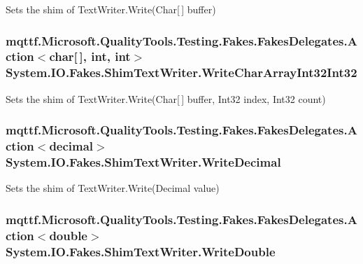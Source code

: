 Sets the shim of Text\-Writer.\-Write(\-Char\mbox{[}$\,$\mbox{]} buffer)

\hypertarget{class_system_1_1_i_o_1_1_fakes_1_1_shim_text_writer_a7270f99bbf90fc744ed5f3eefb151cf2}{
\subsubsection[{Write\-Char\-Array\-Int32\-Int32}]{\setlength{\rightskip}{0pt plus 5cm}mqttf.\-Microsoft.\-Quality\-Tools.\-Testing.\-Fakes.\-Fakes\-Delegates.\-Action$<$char\mbox{[}$\,$\mbox{]}, int, int$>$ System.\-I\-O.\-Fakes.\-Shim\-Text\-Writer.\-Write\-Char\-Array\-Int32\-Int32\hspace{0.3cm}{\ttfamily [set]}}}\label{class_system_1_1_i_o_1_1_fakes_1_1_shim_text_writer_a7270f99bbf90fc744ed5f3eefb151cf2}


Sets the shim of Text\-Writer.\-Write(\-Char\mbox{[}$\,$\mbox{]} buffer, Int32 index, Int32 count)

\hypertarget{class_system_1_1_i_o_1_1_fakes_1_1_shim_text_writer_a7c8ab5a44f689800a60bcc4f6cea8ff7}{
\subsubsection[{Write\-Decimal}]{\setlength{\rightskip}{0pt plus 5cm}mqttf.\-Microsoft.\-Quality\-Tools.\-Testing.\-Fakes.\-Fakes\-Delegates.\-Action$<$decimal$>$ System.\-I\-O.\-Fakes.\-Shim\-Text\-Writer.\-Write\-Decimal\hspace{0.3cm}{\ttfamily [set]}}}\label{class_system_1_1_i_o_1_1_fakes_1_1_shim_text_writer_a7c8ab5a44f689800a60bcc4f6cea8ff7}


Sets the shim of Text\-Writer.\-Write(\-Decimal value)

\hypertarget{class_system_1_1_i_o_1_1_fakes_1_1_shim_text_writer_a0b5e18ceea968a908587767fb92c96f6}{
\subsubsection[{Write\-Double}]{\setlength{\rightskip}{0pt plus 5cm}mqttf.\-Microsoft.\-Quality\-Tools.\-Testing.\-Fakes.\-Fakes\-Delegates.\-Action$<$double$>$ System.\-I\-O.\-Fakes.\-Shim\-Text\-Writer.\-Write\-Double\hspace{0.3cm}{\ttfamily [set]}}}\label{class_system_1_1_i_o_1_1_fakes_1_1_shim_text_writer_a0b5e18ceea968a908587767fb92c96f6}


